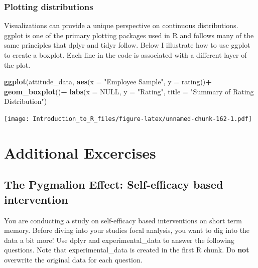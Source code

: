 \documentclass[]{book}
\newenvironment{Shaded}{\begin{snugshade}}{\end{snugshade}}
\newcommand{\DataTypeTok}[1]{\textcolor[rgb]{0.13,0.29,0.53}{#1}}
\newcommand{\KeywordTok}[1]{\textcolor[rgb]{0.13,0.29,0.53}{\textbf{#1}}}
\newcommand{\NormalTok}[1]{#1}
\newcommand{\OperatorTok}[1]{\textcolor[rgb]{0.81,0.36,0.00}{\textbf{#1}}}
\newcommand{\OtherTok}[1]{\textcolor[rgb]{0.56,0.35,0.01}{#1}}
\newcommand{\StringTok}[1]{\textcolor[rgb]{0.31,0.60,0.02}{#1}}
\theoremstyle{definition}
\theoremstyle{definition}
\theoremstyle{definition}
\theoremstyle{remark}
\begin{document}
\hypertarget{plotting-distributions}{%
\section{Plotting distributions}\label{plotting-distributions}}

Visualizations can provide a unique perspective on continuous distributions. ggplot is one of the primary plotting packages used in R and follows many of the same principles that dplyr and tidyr follow. Below I illustrate how to use ggplot to create a boxplot. Each line in the code is associated with a different layer of the plot.

\begin{Shaded}
\begin{Highlighting}[]
\KeywordTok{ggplot}\NormalTok{(attitude_data, }\KeywordTok{aes}\NormalTok{(}\DataTypeTok{x =} \StringTok{"Employee Sample"}\NormalTok{, }\DataTypeTok{y =}\NormalTok{ rating))}\OperatorTok{+}
\StringTok{  }\KeywordTok{geom_boxplot}\NormalTok{()}\OperatorTok{+}
\StringTok{  }\KeywordTok{labs}\NormalTok{(}\DataTypeTok{x =} \OtherTok{NULL}\NormalTok{, }\DataTypeTok{y =} \StringTok{"Rating"}\NormalTok{, }\DataTypeTok{title =} \StringTok{"Summary of Rating Distribution"}\NormalTok{)}
\end{Highlighting}
\end{Shaded}

\texttt{[image: Introduction\_to\_R\_files/figure-latex/unnamed-chunk-162-1.pdf]}

\hypertarget{part-additional-excercises}{%
\part{Additional Excercises}\label{part-additional-excercises}}

\hypertarget{the-pygmalion-effect-self-efficacy-based-intervention}{%
\chapter{The Pygmalion Effect: Self-efficacy based intervention}\label{the-pygmalion-effect-self-efficacy-based-intervention}}

You are conducting a study on self-efficacy based interventions on short term memory. Before diving into your studies focal analysis, you want to dig into the data a bit more! Use dplyr and experimental\_data to answer the following questions. Note that experimental\_data is created in the first R chunk. Do \textbf{not} overwrite the original data for each question.
\end{document}
